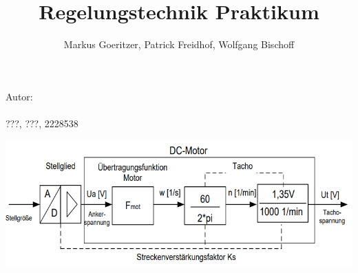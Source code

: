 \documentclass[            %
draft = false,             		%
paper = A4,                		%
pagesize = pdftex,         		%
fontsize = 10pt,           		%
DIV=15,                    		%
twoside = false,           		%
twocolumn = false,         		%
parskip = full,           		%
chapterprefix = false,      		%
appendixprefix = true,     		%
headinclude = false,       		%
footinclude = false,       		%
mpinclude = false,         		%
numbers = auto,            		%
cleardoublepage = plain,   		%
footnotes = multiple,      		%
titlepage = true,          		%
headings = normal,         		%
open = right,              		%
bibliography = openstyle,  		%
listof = chaptergapline,   		%
overfullrule = true,
]{scrbook}
\makeatletter
\newcommand{\faculty}[1]{\gdef\@faculty{#1}}
\newcommand{\@faculty}{\@latex@warning@no@line{No \noexpand\faculty given}}
\newcommand{\thesisType}[1]{\gdef\@thesisType{#1}}
\newcommand{\@thesisType}{\@latex@warning@no@line{No \noexpand\thesisType given}}
\newcommand{\erstpruefer}[1]{\gdef\@erstpruefer{#1}}
\newcommand{\@erstpruefer}{\@latex@warning@no@line{No \noexpand\erstpruefer given}}
\newcommand{\zweitpruefer}[1]{\gdef\@zweitpruefer{#1}}
\newcommand{\@zweitpruefer}{\@latex@warning@no@line{No \noexpand\zweitpruefer given}}
\newcommand{\matrikelnummer}[1]{\gdef\@matrikelnummer{#1}}
\newcommand{\@matrikelnummer}{\@latex@warning@no@line{No \noexpand\matrikelnummer given}}
\makeatother
\begin{document}
\overfullrule=0mm



\author{Markus Goeritzer, Patrick Freidhof, Wolfgang Bischoff}
\title{Regelungstechnik Praktikum}
\subject{Bode Diagram}
\thesisType{Praktikumsbericht}
\faculty{Fakultät Ingenieurswissenschaften}
\erstpruefer{???}
\matrikelnummer{???, ???, 2228538}

\begin{center}
   \makeatletter
   \underline{\@title}
   \makeatother
\end{center}

\begin{flushleft}

   \vspace{4em}
   Autor:\\
   \makeatletter
   \@author\\
   \@matrikelnummer\\
   \makeatother

   \vspace{1em}
   \begin{center}
      \begin{minipage}[b]{0.8\textwidth}
         \includegraphics[scale=0.8]{Bilder/TitlePicture.png}
      \end{minipage}
   \end{center}


\end{flushleft}
\end{document}
